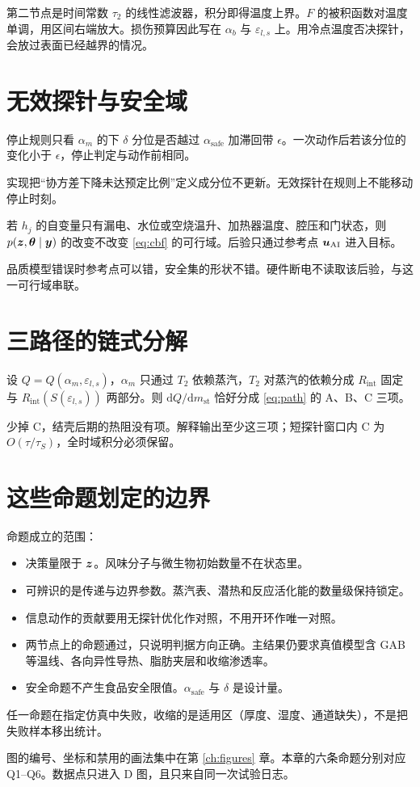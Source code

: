 第二节点是时间常数 $\tau_2$ 的线性滤波器，积分即得温度上界。$F$ 的被积函数对温度单调，用区间右端放大。损伤预算因此写在 $\alpha_b$ 与 $\varepsilon_{l,s}$ 上。用冷点温度否决探针，会放过表面已经越界的情况。

\section{无效探针与安全域}

\begin{proposition}[分位滞回]
\label{prop:invalid}
停止规则只看 $\alpha_m$ 的下 $\delta$ 分位是否越过 $\alpha_{\mathrm{safe}}$ 加滞回带 $\epsilon$。一次动作后若该分位的变化小于 $\epsilon$，停止判定与动作前相同。
\end{proposition}

实现把“协方差下降未达预定比例”定义成分位不更新。无效探针在规则上不能移动停止时刻。

\begin{proposition}[可行域与后验分离]
\label{prop:shield}
若 $h_j$ 的自变量只有漏电、水位或空烧温升、加热器温度、腔压和门状态，则 $p(\bm{z},\bm{\theta}\mid\bm{y})$ 的改变不改变 \eqref{eq:cbf} 的可行域。后验只通过参考点 $\bm{u}_{\mathrm{AI}}$ 进入目标。
\end{proposition}

品质模型错误时参考点可以错，安全集的形状不错。硬件断电不读取该后验，与这一可行域串联。

\section{三路径的链式分解}

\begin{proposition}[路径可加]
\label{prop:path}
设 $Q=Q(\alpha_m,\varepsilon_{l,s})$，$\alpha_m$ 只通过 $T_2$ 依赖蒸汽，$T_2$ 对蒸汽的依赖分成 $R_{\mathrm{int}}$ 固定与 $R_{\mathrm{int}}(S(\varepsilon_{l,s}))$ 两部分。则 $\mathrm{d}Q/\mathrm{d}m_{\mathrm{st}}$ 恰好分成 \eqref{eq:path} 的 A、B、C 三项。
\end{proposition}

少掉 C，结壳后期的热阻没有项。解释输出至少这三项；短探针窗口内 C 为 $O(\tau/\tau_S)$，全时域积分必须保留。

\section{这些命题划定的边界}

命题成立的范围：

\begin{itemize}
\item 决策量限于 $\bm{z}$。风味分子与微生物初始数量不在状态里。
\item 可辨识的是传递与边界参数。蒸汽表、潜热和反应活化能的数量级保持锁定。
\item 信息动作的贡献要用无探针优化作对照，不用开环作唯一对照。
\item 两节点上的命题通过，只说明判据方向正确。主结果仍要求真值模型含 GAB 等温线、各向异性导热、脂肪夹层和收缩渗透率。
\item 安全命题不产生食品安全限值。$\alpha_{\mathrm{safe}}$ 与 $\delta$ 是设计量。
\end{itemize}

任一命题在指定仿真中失败，收缩的是适用区（厚度、湿度、通道缺失），不是把失败样本移出统计。

图的编号、坐标和禁用的画法集中在第 \ref{ch:figures} 章。本章的六条命题分别对应 Q1--Q6。数据点只进入 D 图，且只来自同一次试验日志。
